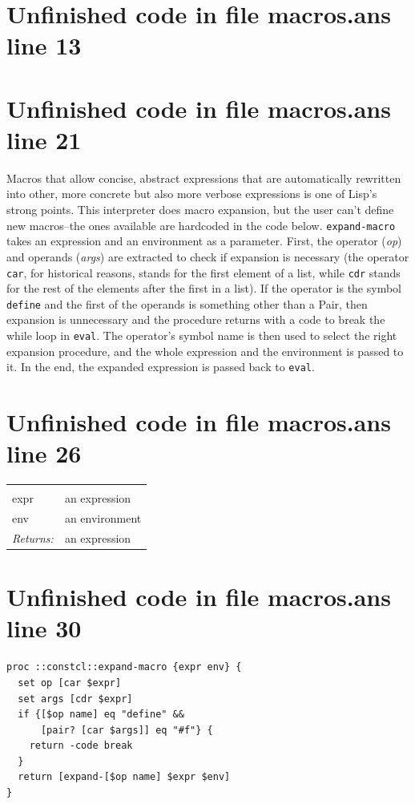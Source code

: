 \documentclass[twoside,9pt]{report}
\begin{document}
\section{Unfinished code in file macros.ans line 13}
\section{Unfinished code in file macros.ans line 21}

Macros that allow concise, abstract expressions that are automatically rewritten into other, more concrete but also more verbose expressions is one of Lisp's strong points. This interpreter does macro expansion, but the user can't define new macros--the ones available are hardcoded in the code below. \texttt{expand-macro} takes an expression and an environment as a parameter. First, the operator (\emph{op}) and operands (\emph{args}) are extracted to check if expansion is necessary (the operator \texttt{car}, for historical reasons, stands for the first element of a list, while \texttt{cdr} stands for the rest of the elements after the first in a list). If the operator is the symbol \texttt{define} and the first of the operands is something other than a Pair, then expansion is unnecessary and the procedure returns with a code to break the while loop in \texttt{eval}. The operator's symbol name is then used to select the right expansion procedure, and the whole expression and the environment is passed to it. In the end, the expanded expression is passed back to \texttt{eval}.

\section{Unfinished code in file macros.ans line 26}
\noindent\begin{tabular}{ |p{1.9cm} p{8cm}| }
\hline
\rowcolor[HTML]{CCCCCC} \multicolumn{2}{|l|}{\bf expand-macro (internal)} \\
expr & an expression \\
env & an environment \\
\textit{Returns:} & an expression \\
\hline
\end{tabular}
\section{Unfinished code in file macros.ans line 30}
\begin{lstlisting}
proc ::constcl::expand-macro {expr env} {
  set op [car $expr]
  set args [cdr $expr]
  if {[$op name] eq "define" &&
      [pair? [car $args]] eq "#f"} {
    return -code break
  }
  return [expand-[$op name] $expr $env]
}
\end{lstlisting}
\end{document}
